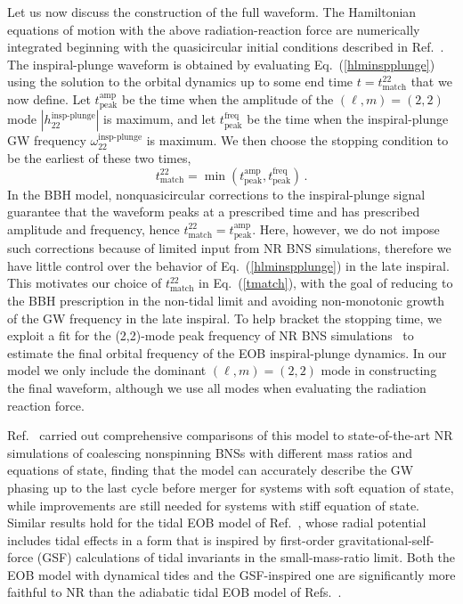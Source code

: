 \documentclass[prd,aps,letter,twocolumn,floatfix,notitlepage,nofootinbib]{revtex4-1}
\begin{document}
Let us now discuss the construction of the full waveform. The Hamiltonian equations of motion with the above radiation-reaction force are numerically integrated beginning with the quasicircular initial conditions described in Ref.~\cite{Buonanno:2005xu}. The inspiral-plunge waveform is obtained by evaluating Eq.~(\ref{hlminspplunge}) using the solution to the orbital dynamics up to some end time $t=t_{\textrm{match}}^{22}$ that we now define. Let $t_{\textrm{peak}}^{\textrm{amp}}$ be the time when the amplitude of the $(\ell,m)=(2,2)$ mode $|h_{22}^{\textrm{insp-plunge}}|$ is maximum, and let $t_{\textrm{peak}}^{\textrm{freq}}$ be the time when the inspiral-plunge GW frequency $\omega_{22}^{\textrm{insp-plunge}}$ is maximum. We then choose the stopping condition to be the earliest of these two times,
\begin{equation}
t_{\textrm{match}}^{22} = \min \left(t_{\textrm{peak}}^{\textrm{amp}},t_{\textrm{peak}}^{\textrm{freq}}\right)\,.\label{tmatch}
\end{equation}
In the BBH model, nonquasicircular corrections to the inspiral-plunge signal guarantee that the waveform peaks at a prescribed time and has prescribed amplitude and frequency, hence $t_{\textrm{match}}^{22}=t_{\textrm{peak}}^{\textrm{amp}}$. Here, however, we do not impose such corrections because of limited input from NR BNS simulations, therefore we have little control over the behavior of Eq.~(\ref{hlminspplunge}) in the late inspiral. This motivates our choice of $t_{\textrm{match}}^{22}$ in Eq.~(\ref{tmatch}), with the goal of reducing to the BBH prescription in the non-tidal limit and avoiding non-monotonic growth of the GW frequency in the late inspiral. To help bracket the stopping time, we exploit a fit for the (2,2)-mode peak frequency of NR BNS simulations~\cite{Bernuzzi:2015rla} to estimate the final orbital frequency of the EOB inspiral-plunge dynamics. %
In our model we only include the dominant $(\ell,m)=(2,2)$ mode in constructing the final waveform, although we use all modes when evaluating the radiation reaction force.

Ref.~\cite{Dietrich:2017feu} carried out comprehensive comparisons of this model to state-of-the-art NR simulations of coalescing nonspinning BNSs with different mass ratios and equations of state, finding that the model can accurately describe the GW phasing up to the last cycle before merger for systems with soft equation of state, while improvements are still needed for systems with stiff equation of state. Similar results hold for the tidal EOB model of Ref.~\cite{Bernuzzi:2014owa}, whose radial potential includes tidal effects in a form that is inspired by first-order gravitational-self-force (GSF) calculations of tidal invariants in the small-mass-ratio limit. Both the EOB model with dynamical tides and the GSF-inspired one are significantly more faithful to NR than the adiabatic tidal EOB model of Refs.~\cite{Damour:2009wj,Bini:2012gu}.
\end{document}
